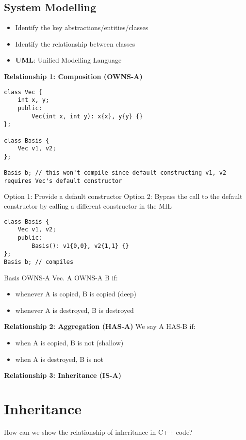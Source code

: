 \documentclass[12pt]{article}
\begin{document}
\subsection{System Modelling}
\begin{itemize}
    \item Identify the key abstractions/entities/classes
    \item Identify the relationship between classes
    \item \textbf{UML}: Unified Modelling Language
\end{itemize}

\textbf{Relationship 1: Composition (OWNS-A)}
\begin{lstlisting}
class Vec {
    int x, y;
    public:
        Vec(int x, int y): x{x}, y{y} {}
};

class Basis {
    Vec v1, v2;
};

Basis b; // this won't compile since default constructing v1, v2 requires Vec's default constructor
\end{lstlisting}
Option 1: Provide a default constructor
Option 2: Bypass the call to the default constructor by calling a different constructor in the MIL
\begin{lstlisting}
class Basis {
    Vec v1, v2;
    public:
        Basis(): v1{0,0}, v2{1,1} {}
};
Basis b; // compiles
\end{lstlisting}
Basis OWNS-A Vec.
A OWNS-A B if:
\begin{itemize}
    \item whenever A is copied, B is copied (deep)
    \item whenever A is destroyed, B is destroyed
\end{itemize}

\textbf{Relationship 2: Aggregation (HAS-A)}
We say A HAS-B if:
\begin{itemize}
    \item when A is copied, B is not (shallow)
    \item when A is destroyed, B is not
\end{itemize}
\textbf{Relationship 3: Inheritance (IS-A)}
\section{Inheritance}

\noindent How can we show the relationship of inheritance in C++ code?
\end{document}
